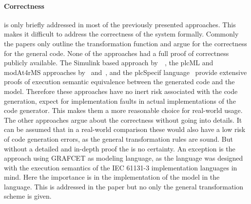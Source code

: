 \paragraph{Correctness} is only briefly addressed in most of the previously presented approaches.
This makes it difficult to address the correctness of the system formally.
Commonly the papers only outline the transformation function and argue for the correctness for the general code.
None of the approaches had a full proof of correctness publicly available.
The Simulink based approach by~\citeauthor{6489667}~\cite{6489667}, the plcML and modAt4rMS approaches by~\citeauthor{WITSCH2015} and~\citeauthor{Obermeier:2015aa}, and the plcSpecif language~\cite{7819191, darvas2015syntax, darvas2015requirements, darvas2015formal, 10.1007/978-3-319-33693-0_32} provide extensive proofs of execution semantic equivalence between the generated code and the model.
Therefore these approaches have no inert risk associated with the code generation, expect for implementation faults in actual implementations of the code generator.
This makes them a more reasonable choice for real-world usage.
The other approaches argue about the correctness without going into details.
It can be assumed that in a real-world comparison these would also have a low risk of code generation errors, as the general transformation rules are sound.
But without a detailed and in-depth proof the is no certainty.
An exception is the approach using GRAFCET as modeling language, as the language was designed with the execution semantics of the IEC 61131-3 implementation languages in mind.
Here the importance is in the implementation of the model in the language.
This is addressed in the paper but no only the general transformation scheme is given.

